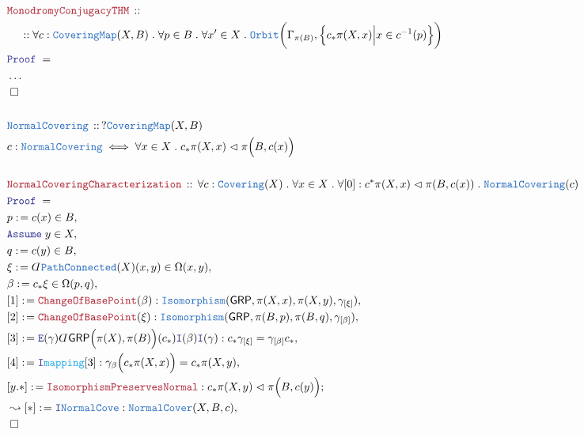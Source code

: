 \documentclass[12pt]{scrartcl}
\newcommand{\TYPE}[1]{\textcolor{NavyBlue}{\mathtt{#1}}}
\newcommand{\FUNC}[1]{\textcolor{Cerulean}{\mathtt{#1}}}
\newcommand{\LOGIC}[1]{\textcolor{Blue}{\mathtt{#1}}}
\newcommand{\THM}[1]{\textcolor{Maroon}{\mathtt{#1}}}
\renewcommand{\.}{\; . \;}
\newcommand{\de}{: \kern 0.1pc =}
\newcommand{\Theorem}[2]{& \THM{#1} \, :: \, #2 \\ & \Proof = \\ }
\newcommand{\DeclareType}[2]{& \TYPE{#1} \, :: \, #2 \\}
\newcommand{\DefineType}[3]{& #1 : \TYPE{#2} \iff #3 \\}
\newcommand{\NewLine}{\\ & \kern 1pc}
\newcommand{\Page}[1]{ \begin{align*} #1 \end{align*}   }
\newcommand{ \bd }{ \ByDef }
\newcommand{\NoProof}{ & \ldots \\ \EndProof}
\newcommand{\Intro}{\LOGIC{I}}
\newcommand{\Elim}{\LOGIC{E}}
\newcommand{\Say}[3]{& #1 \de #2 : #3, \\}
\newcommand{\SayIn}[3]{& #1 \de #2 \in #3, \\}
\newcommand{\Conclude}[3]{& #1 \de #2 : #3; \\}
\newcommand{\Derive}[3]{& \leadsto #1 \de #2 : #3, \\}
\newcommand{\AssumeIn}[2]{& \LOGIC{Assume} \; #1 \in #2, \\}
\newcommand{\QED}{\; \square}
\newcommand{\EndProof}{& \QED \\}
\newcommand{\ByDef}{\rotatebox[origin=c]{-180}{$D$}}%
\newcommand{\Proof}{\LOGIC{Proof} \; }
\newcommand{\Nrml}{\vartriangleleft}
\newcommand{\GRP}{\mathsf{GRP}}
\begin{document}
\Page{
	\Theorem{MonodromyConjugacyTHM}
	{
		\NewLine ::
		\forall c : \TYPE{CoveringMap}(X,B) \.
		\forall p \in B \. 
		\forall x' \in X \. 
		\TYPE{Orbit}\bigg(
			\Gamma_{\pi(B)},
			\Big\{ c_* \pi(X,x) \Big| x \in c^{-1}(p)  \Big\}
		\bigg)
	}
	\NoProof
	\\
	\DeclareType{NormalCovering}{? \TYPE{CoveringMap}(X,B)}
	\DefineType{c}{NormalCovering}{
		\forall x \in X \.
		c_* \pi(X,x) \Nrml \pi\Big(B, c(x)\Big)
	}
	\\
	\Theorem{NormalCoveringCharacterization}
	{
		\forall c : \TYPE{Covering}(X) \.
		\forall x \in X \.
		\forall [0] : c^* \pi(X,x) \Nrml \pi( B, c(x) ) \.
		\TYPE{NormalCovering}(c)
	}
	\SayIn{p}{c(x)}{B}
	\AssumeIn{y}{X}
	\SayIn{q}{c(y)}{B}
	\SayIn{\xi}{\bd \TYPE{PathConnected}(X)(x,y)}{\Omega(x,y)}
	\SayIn{\beta}{ c_* \xi }{\Omega(p,q)}
	\Say{[1]}{\THM{ChangeOfBasePoint}(\beta)}
	{
		\TYPE{Isomorphism}(\GRP, \pi(X,x),\pi(X,y), \gamma_{[\xi]} )
	}
	\Say{[2]}{\THM{ChangeOfBasePoint}(\xi)}
	{
		\TYPE{Isomorphism}(\GRP, \pi(B,p),\pi(B,q), \gamma_{[\beta]} )
	}
	\Say{[3]}
	{ 
		\Elim(\gamma)
		\bd \GRP\Big(\pi(X),\pi(B)\Big)(c_*) \Intro(\beta) \Intro(\gamma)
	}
	{
		c_* \gamma_{[\xi]} = \gamma_{[\beta]} c_*
	}
	\Say{[4]}{\Intro \FUNC{mapping}[3]}
	{
		\gamma_{\beta}\Big( c_* \pi(X,x) \Big) = c_* \pi(X,y)
	}
	\Conclude{[y.*]}{\THM{IsomorphismPreservesNormal}}
	{
		c_* \pi(X,y) \Nrml \pi\Big(B, c(y)\Big) 
	}
	\Derive{[*]}{\Intro \TYPE{NormalCove}}
	{
		\TYPE{NormalCover}(X,B,c)
	}
	\EndProof
}
\newpage
\end{document}

